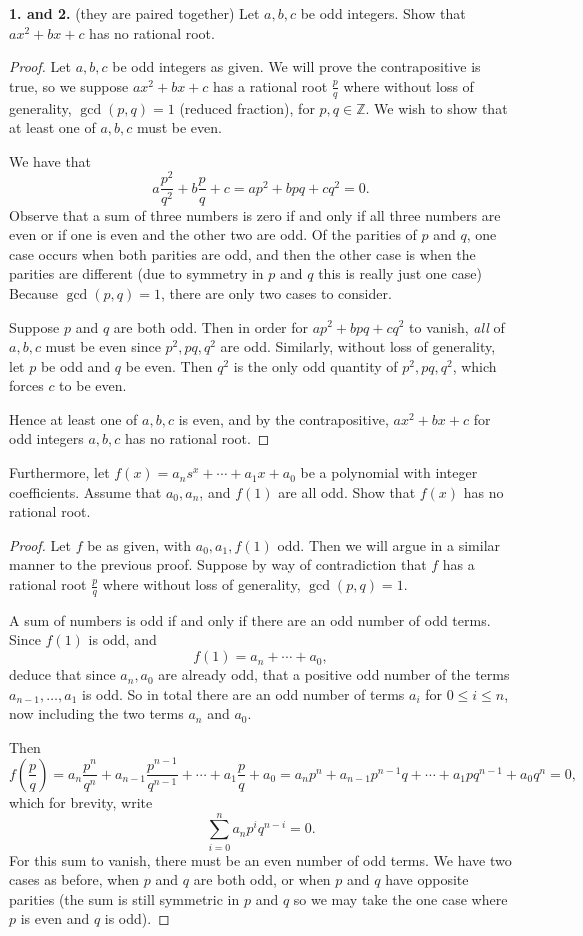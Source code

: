 \documentclass[11pt]{article}
\begin{document}
\textbf{1. and 2.} (they are paired together) Let $a,b,c$ be odd integers. Show that $ax^2+bx+c$ has no rational root. \begin{proof}
    Let $a,b,c$ be odd integers as given. We will prove the contrapositive is true, so we suppose $ax^2+bx+c$ has a rational root $\frac{p}{q}$ where without loss of generality, $\gcd(p,q) = 1$ (reduced fraction), for $p,q\in\mathbb{Z}$. We wish to show that at least one of $a,b,c$ must be even.
    
    We have that \[a\frac{p^2}{q^2} + b\frac{p}{q} + c = ap^2+bpq + cq^2 = 0.\] Observe that a sum of three numbers is zero if and only if all three numbers are even or if one is even and the other two are odd. Of the parities of $p$ and $q$, one case occurs when both parities are odd, and then the other case is when the parities are different (due to symmetry in $p$ and $q$ this is really just one case) Because $\gcd(p,q) = 1$, there are only two cases to consider.

    Suppose $p$ and $q$ are both odd. Then in order for $ap^2+bpq + cq^2$ to vanish, \textit{all} of $a,b,c$ must be even since $p^2,pq,q^2$ are odd. Similarly, without loss of generality, let $p$ be odd and $q$ be even. Then $q^2$ is the only odd quantity of $p^2,pq,q^2$, which forces $c$ to be even.

    Hence at least one of $a,b,c$ is even, and by the contrapositive, $ax^2+bx+c$ for odd integers $a,b,c$ has no rational root.
\end{proof} Furthermore, let $f(x) = a_ns^x + \cdots + a_1x + a_0$ be a polynomial with integer coefficients. Assume that $a_0,a_n$, and $f(1)$ are all odd. Show that $f(x)$ has no rational root. \begin{proof}
    Let $f$ be as given, with $a_0,a_1,f(1)$ odd. Then we will argue in a similar manner to the previous proof. Suppose by way of contradiction that $f$ has a rational root $\frac{p}{q}$ where without loss of generality, $\gcd(p,q) = 1$.

    A sum of numbers is odd if and only if there are an odd number of odd terms. Since $f(1)$ is odd, and \[f(1) = a_n+\cdots +a_0,\] deduce that since $a_n,a_0$ are already odd, that a positive odd number of the terms $a_{n-1},\dots,a_1$ is odd. So in total there are an odd number of terms $a_i$ for $0 \leq i \leq n$, now including the two terms $a_n$ and $a_0$.

    Then \[f\left(\frac{p}{q}\right) = a_n\frac{p^n}{q^n} + a_{n-1}\frac{p^{n-1}}{q^{n-1}} + \cdots + a_1\frac{p}{q} + a_0 = a_np^n + a_{n-1}p^{n-1}q + \cdots + a_1pq^{n-1} + a_0q^n = 0,\] which for brevity, write \[\sum_{i=0}^n a_np^{i}q^{n-i} = 0.\] For this sum to vanish, there must be an even number of odd terms. We have two cases as before, when $p$ and $q$ are both odd, or when $p$ and $q$ have opposite parities (the sum is still symmetric in $p$ and $q$ so we may take the one case where $p$ is even and $q$ is odd).


\end{proof}
\end{document}
